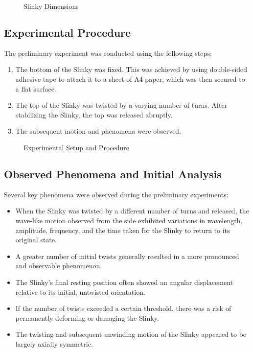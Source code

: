 \documentclass{mcmthesis}  %
\begin{document}
\begin{figure}[h!]
    \centering
    \caption{Slinky Dimensions}
    \label{fig:slinky_dimensions}
\end{figure}

\subsection{Experimental Procedure} %
The preliminary experiment was conducted using the following steps:
\begin{enumerate}
    \item The bottom of the Slinky was fixed. This was achieved by using double-sided adhesive tape to attach it to a sheet of A4 paper, which was then secured to a flat surface.
    \item The top of the Slinky was twisted by a varying number of turns. After stabilizing the Slinky, the top was released abruptly.
    \item The subsequent motion and phenomena were observed.
\end{enumerate}

\begin{figure}[h!]
    \centering
    \caption{Experimental Setup and Procedure}
    \label{fig:exp_setup}
\end{figure}

\subsection{Observed Phenomena and Initial Analysis} %
Several key phenomena were observed during the preliminary experiments:
\begin{itemize}
    \item When the Slinky was twisted by a different number of turns and released, the wave-like motion observed from the side exhibited variations in wavelength, amplitude, frequency, and the time taken for the Slinky to return to its original state.
    \item A greater number of initial twists generally resulted in a more pronounced and observable phenomenon.
    \item The Slinky's final resting position often showed an angular displacement relative to its initial, untwisted orientation.
    \item If the number of twists exceeded a certain threshold, there was a risk of permanently deforming or damaging the Slinky.
    \item The twisting and subsequent unwinding motion of the Slinky appeared to be largely axially symmetric.
\end{itemize}
\end{document}
